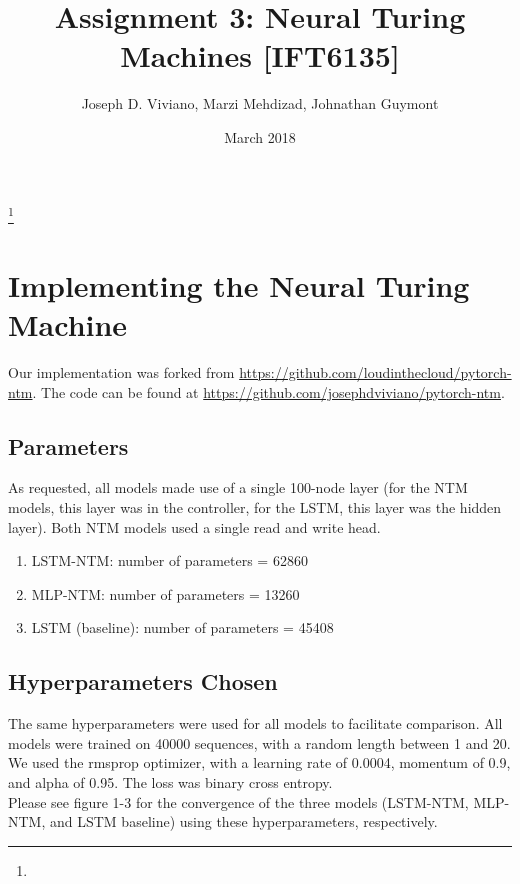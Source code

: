 \documentclass{amsart}
\theoremstyle{definition}
\theoremstyle{remark}
\numberwithin{equation}{section}
\begin{document}
\title{Assignment 3: Neural Turing Machines [IFT6135]}

\author{Joseph D. Viviano, Marzi Mehdizad, Johnathan Guymont}
\address{Universit\'e de Montr\'eal}
\curraddr{}
\thanks{}
\date{March 2018}

\maketitle

\section{Implementing the Neural Turing Machine}

Our implementation was forked from \url{https://github.com/loudinthecloud/pytorch-ntm}.
The code can be found at \url{https://github.com/josephdviviano/pytorch-ntm}.\\

\subsection{Parameters}

As requested, all models made use of a single 100-node layer (for the NTM models,
this layer was in the controller, for the LSTM, this layer was the hidden layer).
Both NTM models used a single read and write head.


\begin{enumerate}
  \item{LSTM-NTM: number of parameters = 62860}
  \item{MLP-NTM: number of parameters = 13260}
  \item{LSTM (baseline): number of parameters = 45408}
\end{enumerate}

\subsection{Hyperparameters Chosen}

The same hyperparameters were used for all models to facilitate comparison. All
models were trained on 40000 sequences, with a random length between 1 and 20.
We used the rmsprop optimizer, with a learning rate of 0.0004, momentum of 0.9,
and alpha of 0.95. The loss was binary cross entropy. \\

Please see figure 1-3 for the convergence of the three models (LSTM-NTM,
MLP-NTM, and LSTM baseline) using these hyperparameters, respectively. \\
\end{document}

